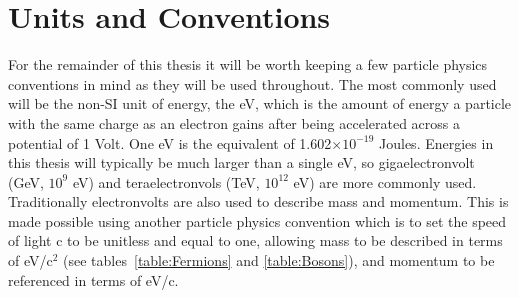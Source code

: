 \section{Units and Conventions}
 
For the remainder of this thesis it will be worth keeping a few particle physics conventions in mind as they will be used throughout.  
The most commonly used will be the non-SI unit of energy, the \gls{eV}, which is the amount of energy a particle with the same charge as an electron gains after being accelerated across a potential of 1 Volt.  
One eV is the equivalent of 1.602$\times 10^{-19}$ Joules.  
Energies in this thesis will typically be much larger than a single eV, so gigaelectronvolt (GeV, $10^9$ eV) and teraelectronvols  (TeV, $10^12$ eV) are more commonly used.  
Traditionally electronvolts are also used to describe mass and momentum.  
This is made possible using another particle physics convention which is to set the speed of light c to be unitless and equal to one, allowing mass to be described in terms of eV/c$^2$ (see tables~\ref{table:Fermions} and \ref{table:Bosons}), and momentum to be referenced in terms of eV/c.  \\


